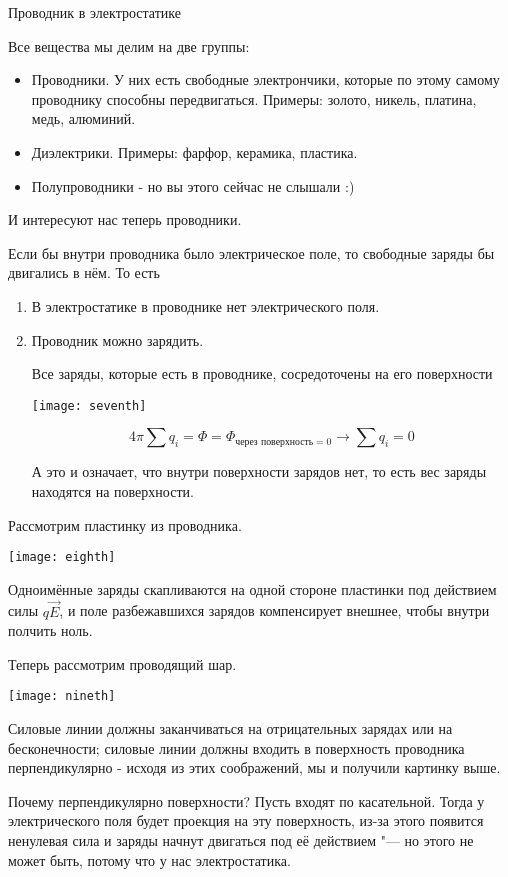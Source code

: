 \begin{section}{Проводник в электростатике}

	Все вещества мы делим на две группы:
	\begin{itemize}
	
	\item
		Проводники. У них есть свободные электрончики, которые по этому самому проводнику способны передвигаться. 
		Примеры: золото, никель, платина, медь, алюминий.
	
	\item
		Диэлектрики. Примеры: фарфор, керамика, пластика.
		
	\item
		Полупроводники - но вы этого сейчас не слышали :)
	
	\end{itemize}
	
	И интересуют нас теперь проводники.
	
	Если бы внутри проводника было электрическое поле, то свободные заряды бы двигались в нём. То есть
	\begin{enumerate}
	
	\item
		В электростатике в проводнике нет электрического поля.
		
	\item
		Проводник можно зарядить. 
		
		Все заряды, которые есть в проводнике, сосредоточены на его поверхности
		\begin{center}
		\texttt{[image: seventh]}
		\end{center}

		\[4\pi\sum q_i = \Phi = \Phi_{\text{через поверхность} = 0} \rightarrow \sum q_i = 0\]
		
		А это и означает, что внутри поверхности зарядов нет, то есть вес заряды находятся на поверхности.
	
	\end{enumerate}

	Рассмотрим пластинку из проводника.
	\begin{center}
	\texttt{[image: eighth]}
	\end{center}

	Одноимённые заряды скапливаются на одной стороне пластинки под действием силы $q \vec{E}$, и поле разбежавшихся зарядов компенсирует
	внешнее, чтобы внутри полчить ноль.
	
	Теперь рассмотрим проводящий шар.
	\begin{center}
	\texttt{[image: nineth]}
	\end{center}

	Силовые линии должны заканчиваться на отрицательных зарядах или на бесконечности; силовые линии должны входить 
	в поверхность проводника перпендикулярно - исходя из этих соображений, мы и получили картинку выше. 
	
	Почему перпендикулярно поверхности? Пусть входят по касательной. Тогда у электрического поля будет проекция на эту поверхность, из-за
	 этого появится ненулевая сила и заряды начнут двигаться под её действием "--- но этого не может быть, потому что у нас электростатика.

\end{section}

